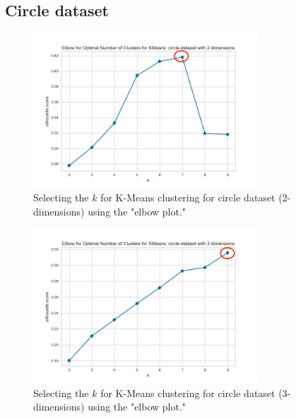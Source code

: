 \subsection{Circle dataset}

\begin{figure}[H]
  \includegraphics[width=0.75\textwidth]{Method/images/k-values/circle-dataset-2-kmeans.png}
  \caption{Selecting the $k$ for K-Means clustering for circle dataset (2-dimensions) using the "elbow plot."}
  \label{hyperparameters:agglomerative-circle-dataset-2d}
\end{figure}
\begin{figure}[H]
  \includegraphics[width=0.75\textwidth]{Method/images/k-values/circle-dataset-3-kmeans.png}
  \caption{Selecting the $k$ for K-Means clustering for circle dataset (3-dimensions) using the "elbow plot."}
  \label{hyperparameters:agglomerative-circle-dataset-3d}
\end{figure}
\newpage

